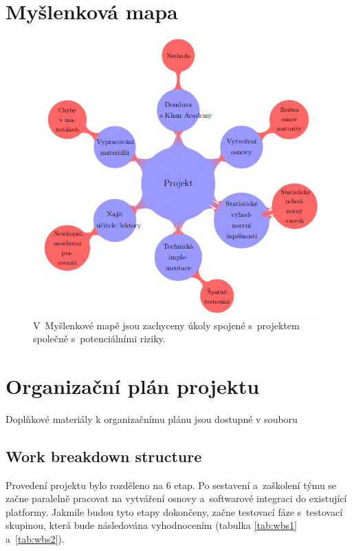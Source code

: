 \documentclass[12pt, a4paper]{report}
\begin{document}
\chapter{Myšlenková mapa}
\label{sec:org4821ac4}

\begin{figure}[htbp]
\centering
\includegraphics[width=.9\linewidth]{./images/myslenkova_mapa.png}
\caption[\textbf{Myšlenková mapa}]{\label{fig:org90a0a97}
V Myšlenkové mapě jsou zachyceny úkoly spojené s projektem společně s potenciálními riziky.}
\end{figure}


\chapter{Organizační plán projektu}
\label{sec:org0e23595}
Doplňkové materiály k organizačnímu plánu jsou dostupné v souboru \cite{ms_project_soubor}

\section{Work breakdown structure}
\label{sec:orgf836ddf}
Provedení projektu bylo rozděleno na 6 etap. Po sestavení a zaškolení týmu se
začne paralelně pracovat na vytváření osnovy a softwarové integraci do
existující platformy. Jakmile budou tyto etapy dokončeny, začne testovací fáze
s testovací skupinou, která bude následována vyhodnocením (tabulka \ref{tab:wbs1}
a \ref{tab:wbs2}).
\end{document}
